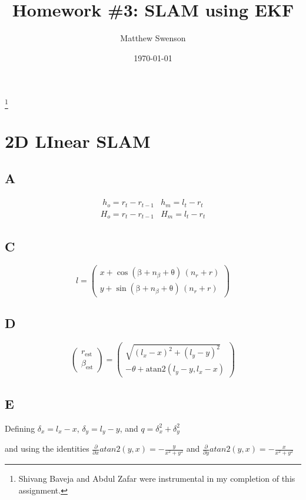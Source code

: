 \documentclass[letterpaper]{article}
\title{Homework \#3: SLAM using EKF}
\author{ Matthew Swenson }
\date{\today}
\begin{document}
  \maketitle
\thanks{Shivang Baveja and Abdul Zafar were instrumental in my completion of this assignment.}
    \newpage

\section{2D LInear SLAM}
\subsection*{A}
\begin{align}
    & h_o = r_t - r_{t-1} & h_m = l_t - r_t & 
\end{align}
\begin{align}
    & H_o = r_t - r_{t-1} & H_m = l_t - r_t & 
\end{align}




\subsection*{C}
$$
l = \left(\begin{array}{c} x+\cos\left(\mathrm{\beta}+n_{\beta }+\mathrm{\theta}\right)\,\left(n_{r}+r\right)\\ y+\sin\left(\mathrm{\beta}+n_{\beta }+\mathrm{\theta}\right)\,\left(n_{r}+r\right) \end{array}\right) 
$$
\subsection*{D}
$$
\left(\begin{array}{c} r_{\mathrm{est}}\\ \beta _{\mathrm{est}} \end{array}\right)
=
\left(\begin{array}{c} \sqrt{{\left(l_{x}-x\right)}^2+{\left(l_{y}-y\right)}^2}\\ -\theta+\text{atan2}\left(l_{y}-y,l_{x}-x\right) \end{array}\right)
$$
\subsection*{E}
Defining $\delta_x = l_x - x$, $\delta_y = l_y - y$, and $q = \delta_x^2 + \delta_y^2$


and using the identities $\frac{\partial}{\partial x}atan2(y,x) = -\frac{y}{x^2+y^2}$ and $\frac{\partial}{\partial y}atan2(y,x) = -\frac{x}{x^2+y^2}$ 
\end{document}

